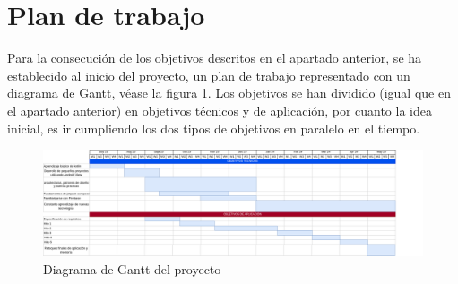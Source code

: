 \section{Plan de trabajo}
Para la consecución de los objetivos descritos en el apartado anterior, se ha establecido al inicio del proyecto, un plan de trabajo representado con un diagrama de Gantt, véase la figura \ref{fig:Gantt}. Los objetivos se han dividido (igual que en el apartado anterior) en objetivos técnicos y de aplicación, por cuanto la idea inicial, es ir cumpliendo los dos tipos de objetivos en paralelo en el tiempo.
\begin{figure}[h]
	\centering
	\includegraphics[width = 1\textwidth]{Imagenes/Bitmap/Gantt_Diagram.png}
	\caption{Diagrama de Gantt del proyecto}
	\label{fig:Gantt}
\end{figure}

